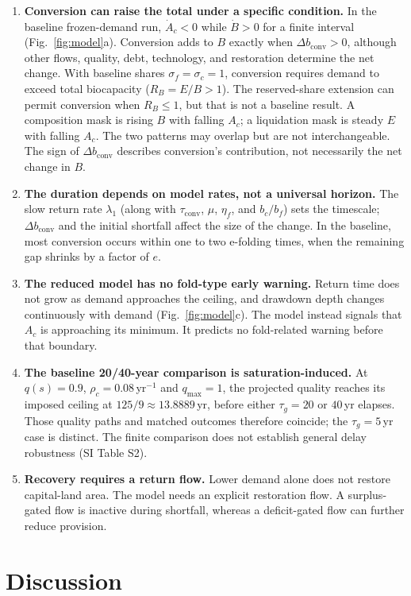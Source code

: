 \documentclass[preprint,12pt,authoryear]{elsarticle}
\newcommand{\dconv}{\Delta b_{\mathrm{conv}}}
\newcommand{\tconv}{\tau_{\mathrm{conv}}}
\begin{document}
\begin{enumerate}[label=P\arabic*.,leftmargin=2.2em]
\item \textbf{Conversion can raise the total under a specific condition.} In the baseline frozen-demand run, $\dot A_c<0$ while $\dot B>0$ for a finite interval (Fig.~\ref{fig:model}a). Conversion adds to $B$ exactly when $\dconv>0$, although other flows, quality, debt, technology, and restoration determine the net change. With baseline shares $\sigma_f=\sigma_c=1$, conversion requires demand to exceed total biocapacity ($R_B=E/B>1$). The reserved-share extension can permit conversion when $R_B\le1$, but that is not a baseline result. A composition mask is rising $B$ with falling $A_c$; a liquidation mask is steady $E$ with falling $A_c$. The two patterns may overlap but are not interchangeable. The sign of $\dconv$ describes conversion's contribution, not necessarily the net change in $B$.
\item \textbf{The duration depends on model rates, not a universal horizon.} The slow return rate $\lambda_1$ (along with $\tconv$, $\mu$, $\eta_f$, and $b_c/b_f$) sets the timescale; $\dconv$ and the initial shortfall affect the size of the change. In the baseline, most conversion occurs within one to two e-folding times, when the remaining gap shrinks by a factor of $e$.
\item \textbf{The reduced model has no fold-type early warning.} Return time does not grow as demand approaches the ceiling, and drawdown depth changes continuously with demand (Fig.~\ref{fig:model}c). The model instead signals that $A_c$ is approaching its minimum. It predicts no fold-related warning before that boundary.
\item \textbf{The baseline 20/40-year comparison is saturation-induced.} At $q(s)=0.9$, $\rho_c=0.08$\,yr$^{-1}$ and $q_{\max}=1$, the projected quality reaches its imposed ceiling at $125/9\approx13.8889$\,yr, before either $\tau_g=20$ or $40$\,yr elapses. Those quality paths and matched outcomes therefore coincide; the $\tau_g=5$\,yr case is distinct. The finite comparison does not establish general delay robustness (SI Table S2).
\item \textbf{Recovery requires a return flow.} Lower demand alone does not restore capital-land area. The model needs an explicit restoration flow. A surplus-gated flow is inactive during shortfall, whereas a deficit-gated flow can further reduce provision.
\end{enumerate}
\clearpage
\section{Discussion}\label{sec:discussion}
\end{document}
